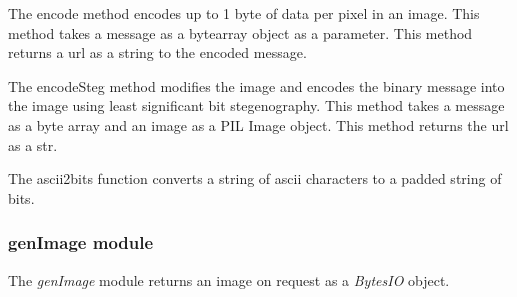 \documentclass[letterpaper,12pt,openany,oneside]{sphinxmanual}
\begin{document}
\begin{fulllineitems}
\begin{fulllineitems}
\end{fulllineitems}


\begin{fulllineitems}
\label{Image_Manipulation:covertFS.Image_Manipulation.lsbsteg.Steg.encode}
The encode method encodes up to 1 byte of data per pixel in an image.
This method takes a message as a bytearray object as a parameter.
This method returns a url as a string to the encoded message.

\end{fulllineitems}


\begin{fulllineitems}
\label{Image_Manipulation:covertFS.Image_Manipulation.lsbsteg.Steg.encodeSteg}
The encodeSteg method modifies the image and encodes the binary
message into the image using least significant bit stegenography.
This method takes a message as a byte array and an image as a
PIL Image object.
This method returns the url as a str.

\end{fulllineitems}


\end{fulllineitems}


\begin{fulllineitems}
\label{Image_Manipulation:covertFS.Image_Manipulation.lsbsteg.ascii2bits}
The ascii2bits function converts a string of ascii characters to a
padded string of bits.

\end{fulllineitems}



\subsubsection{genImage module}
\label{Image_Manipulation:genimage-module}\label{Image_Manipulation:module-covertFS.Image_Manipulation.genImage}
The \emph{genImage} module returns an image on request as a \emph{BytesIO} object.
\end{document}
